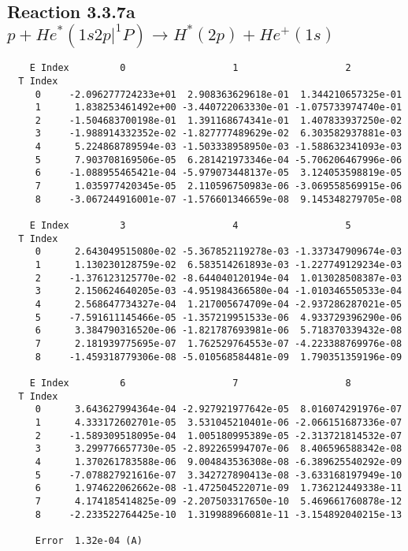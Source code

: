 \documentclass[12pt]{article}
\begin{document}
                               


\newpage
\subsection{
Reaction 3.3.7a $  p + He^*(1s2p|^1P) \rightarrow H^*(2p) + He^+(1s)$}


\begin{small}\begin{verbatim}
    E Index         0                   1                   2
  T Index
     0     -2.096277724233e+01  2.908363629618e-01  1.344210657325e-01
     1      1.838253461492e+00 -3.440722063330e-01 -1.075733974740e-01
     2     -1.504683700198e-01  1.391168674341e-01  1.407833937250e-02
     3     -1.988914332352e-02 -1.827777489629e-02  6.303582937881e-03
     4      5.224868789594e-03 -1.503338958950e-03 -1.588632341093e-03
     5      7.903708169506e-05  6.281421973346e-04 -5.706206467996e-06
     6     -1.088955465421e-04 -5.979073448137e-05  3.124053598819e-05
     7      1.035977420345e-05  2.110596750983e-06 -3.069558569915e-06
     8     -3.067244916001e-07 -1.576601346659e-08  9.145348279705e-08

    E Index         3                   4                   5
  T Index
     0      2.643049515080e-02 -5.367852119278e-03 -1.337347909674e-03
     1      1.130230128759e-02  6.583514261893e-03 -1.227749129234e-03
     2     -1.376123125770e-02 -8.644040120194e-04  1.013028508387e-03
     3      2.150624640205e-03 -4.951984366580e-04 -1.010346550533e-04
     4      2.568647734327e-04  1.217005674709e-04 -2.937286287021e-05
     5     -7.591611145466e-05 -1.357219951533e-06  4.933729396290e-06
     6      3.384790316520e-06 -1.821787693981e-06  5.718370339432e-08
     7      2.181939775695e-07  1.762529764553e-07 -4.223388769976e-08
     8     -1.459318779306e-08 -5.010568584481e-09  1.790351359196e-09

    E Index         6                   7                   8
  T Index
     0      3.643627994364e-04 -2.927921977642e-05  8.016074291976e-07
     1      4.333172602701e-05  3.531045210401e-06 -2.066151687336e-07
     2     -1.589309518095e-04  1.005180995389e-05 -2.313721814532e-07
     3      3.299776657730e-05 -2.892265994707e-06  8.406596588342e-08
     4      1.370261783588e-06  9.004843536308e-08 -6.389625540292e-09
     5     -7.078827921616e-07  3.342727890413e-08 -3.633168197949e-10
     6      1.974622062662e-08 -1.472504522071e-09  1.736212449338e-11
     7      4.174185414825e-09 -2.207503317650e-10  5.469661760878e-12
     8     -2.233522764425e-10  1.319988966081e-11 -3.154892040215e-13

     Error  1.32e-04 (A)
\end{verbatim}\end{small}
\end{document}
